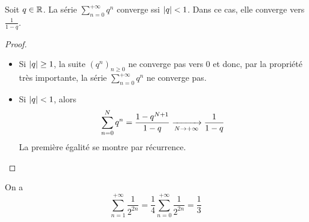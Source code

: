 \begin{proposition}
    Soit $q\in\mathbb{R}$. La série $\sum_{n = 0}^{+\infty}q^n$ converge ssi $\left| q \right|<1$. Dans ce cas, elle converge vers $\frac 1{1-q}$.
\end{proposition}
\begin{proof}
\begin{itemize}
    \item   Si $\left| q \right|\ge 1$, la suite $(q^n)_{n\ge0}$ ne converge pas vers $0$ et donc, par la propriété très importante, la série  $\sum_{n = 0}^{+\infty}q^n$ ne converge pas.
    \item Si $\left| q \right|<1$, alors $$\sum_{n = 0}^{N}q^n = \frac{1-q^{N+1}}{1-q}\xrightarrow[N\to + \infty]{} \frac 1{1-q}$$ La première égalité se montre par récurrence.
\end{itemize}
\end{proof}
\begin{exemple}
    On a $$\sum_{n = 1}^{+\infty}\frac{1}{2^{2n}} = \frac14\sum_{n = 0}^{+\infty}\frac{1}{2^{2n}} = \frac13$$
\end{exemple}
